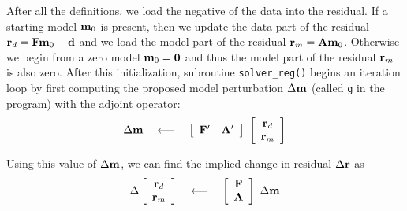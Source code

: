 \par
After all the definitions,
we load the negative of the data into the residual.
If a starting model $\bold m_0$ is present,
then we update the data part of the residual
$\bold r_d=\bold F \bold m_0 - \bold d$
and we load
the model part of the residual
$ \bold r_m = \bold A \bold m_0$.
Otherwise we begin from a zero model $\bold m_0=\bold 0$ and thus
the model part of the residual $ \bold r_m$ is also zero.
After this initialization, subroutine 
\texttt{solver\_reg()} %
begins an iteration loop by first computing
the proposed model perturbation $\Delta \bold m$
(called \texttt{g} in the program)
with the adjoint operator:
\begin{equation}
 \Delta \bold m
 \quad\longleftarrow\quad
 \left[
 \begin{array}{cc}
   \bold F' &   \bold A'
 \end{array}
 \right]
 \
 \left[
 \begin{array}{c}
   \bold r_d \\
   \bold r_m
 \end{array}
 \right]
\end{equation}
\begin{comment}
I chose to implement the model roughening operator $\bold A$
with the convolution subroutine \texttt{tcai1()} \vpageref{lst:tcai1},
which has transient end effects
(and an output length equal to the input length plus the filter length).
The adjoint of subroutine {\tt tcai1()} suggests perturbations
in the convolution input (not the filter).
\end{comment}
Using this value of $\Delta \bold m$,
we can
find the implied change in residual $\Delta \bold r$ as
\begin{equation}
        \Delta
        \left[
        \begin{array}{c}
        \bold r_d \\
        \bold r_m
        \end{array}
        \right]
\quad\longleftarrow\quad
        \left[
        \begin{array}{c}
        \bold F \\
        \bold A
        \end{array}
        \right]
        \
        \Delta \bold m
\end{equation}
